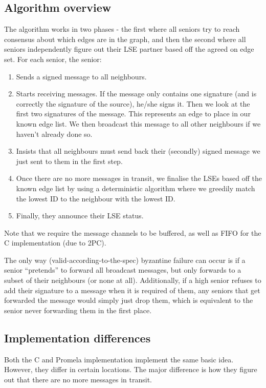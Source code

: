\documentclass[a4paper]{scrartcl}
\begin{document}
\subsection{Algorithm overview}
The algorithm works in two phases - the first where all seniors try to reach consensus about which edges are in the graph, and then the second where all seniors independently figure out their LSE partner based off the agreed on edge set. For each senior, the senior:
\begin{enumerate}
    \item Sends a signed message to all neighbours.
    \item Starts receiving messages. If the message only contains one signature (and is correctly the signature of the source), he/she signs it. Then we look at the first two signatures of the message. This represents an edge to place in our known edge list. We then broadcast this message to all other neighbours if we haven't already done so.
    \item Insists that all neighbours must send back their (secondly) signed message we just sent to them in the first step.
    \item Once there are no more messages in transit, we finalise the LSEs based off the known edge list by using a deterministic algorithm where we greedily match the lowest ID to the neighbour with the lowest ID.
    \item Finally, they announce their LSE status.
\end{enumerate}

Note that we require the message channels to be buffered, as well as FIFO for the C implementation (due to 2PC).

The only way (valid-according-to-the-spec) byzantine failure can occur is if a senior ``pretends'' to forward all broadcast messages, but only forwards to a subset of their neighbours (or none at all). Additionally, if a high senior refuses to add their signature to a message when it is required of them, any seniors that get forwarded the message would simply just drop them, which is equivalent to the senior never forwarding them in the first place.

\subsection{Implementation differences}
Both the C and Promela implementation implement the same basic idea. However, they differ in certain locations. The major difference is how they figure out that there are no more messages in transit.
\end{document}
